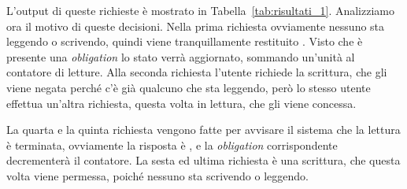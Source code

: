 L'output di queste richieste è mostrato in Tabella~\ref{tab:risultati_1}. Analizziamo ora il motivo di queste decisioni. Nella prima richiesta ovviamente nessuno sta leggendo o scrivendo, quindi viene tranquillamente restituito \permit. Visto che è presente una \textit{obligation} lo stato verrà aggiornato, sommando un'unità al contatore di letture.
Alla seconda richiesta l'utente richiede la scrittura, che gli viene negata perché c'è già qualcuno che sta leggendo, però lo stesso utente effettua un'altra richiesta, questa volta in lettura, che gli viene concessa. \par
La quarta e la quinta richiesta vengono fatte per avvisare il sistema che la lettura è terminata, ovviamente la risposta è \permit, e la \textit{obligation} corrispondente decrementerà il contatore.
La sesta ed ultima richiesta è una scrittura, che questa volta viene permessa, poiché nessuno sta scrivendo o leggendo.
